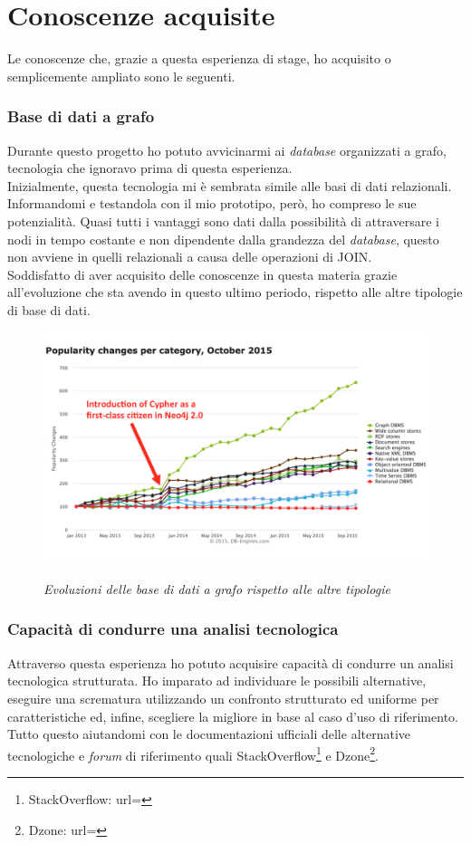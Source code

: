 \section{Conoscenze acquisite}
Le conoscenze che, grazie a questa esperienza di stage, ho acquisito o semplicemente ampliato sono le seguenti.
\subsubsection{Base di dati a grafo}
Durante questo progetto ho potuto avvicinarmi ai \textit{database} organizzati a grafo, tecnologia che ignoravo prima di questa esperienza.\\
Inizialmente, questa tecnologia mi è sembrata simile alle basi di dati relazionali. Informandomi e testandola con il mio prototipo, però, ho compreso le sue potenzialità. Quasi tutti i vantaggi sono dati dalla possibilità di attraversare i nodi in tempo costante e non dipendente dalla grandezza del \textit{database}, questo non avviene in quelli relazionali a causa delle operazioni di \gls{JOIN}.\\
Soddisfatto di aver acquisito delle conoscenze in questa materia grazie all'evoluzione che sta avendo in questo ultimo periodo, rispetto alle altre tipologie di base di dati.
\begin{figure}[h!]
	\centering
	\includegraphics[scale=0.4]{immagini/graphchange.png}
	\label{fig:figura 2.2}
	\caption{\textit{Evoluzioni delle base di dati a grafo rispetto alle altre tipologie }}
\end{figure}
\newpage
\subsubsection{Capacità di condurre una analisi tecnologica}
Attraverso questa esperienza ho potuto acquisire capacità di condurre un analisi tecnologica strutturata. Ho imparato ad individuare le possibili alternative, eseguire una scrematura utilizzando un confronto strutturato ed uniforme per caratteristiche ed, infine, scegliere la migliore in base al caso d'uso di riferimento. Tutto questo aiutandomi con le documentazioni ufficiali delle alternative tecnologiche e \textit{forum} di riferimento quali StackOverflow\footnote{StackOverflow: url= } e Dzone\footnote{Dzone: url= }.

